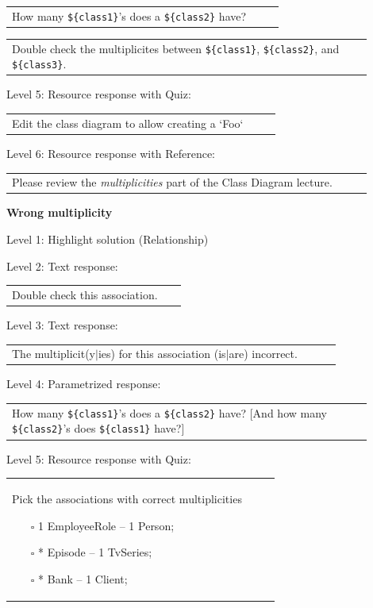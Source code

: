 \begin{tabular}{|p{0.9\linewidth}}
How many \verb|${class1}|'s does a \verb|${class2}| have?
\end{tabular} \medskip

\begin{tabular}{|p{0.9\linewidth}}
Double check the multiplicites between \verb|${class1}|, \verb|${class2}|, and \verb|${class3}|.
\end{tabular} \medskip

\noindent Level 5: Resource response with Quiz: \medskip

\begin{tabular}{|p{0.9\linewidth}}
Edit the class diagram to allow creating a `Foo`
\end{tabular} \medskip

\noindent Level 6: Resource response with Reference: \medskip

\begin{tabular}{|p{0.9\linewidth}}
Please review the \textit{multiplicities} part of the Class Diagram lecture.
\end{tabular} \medskip


\noindent \textbf{Wrong multiplicity} \medskip

\noindent Level 1: Highlight solution (Relationship) \medskip

\noindent Level 2: Text response: \medskip

\begin{tabular}{|p{0.9\linewidth}}
Double check this association.
\end{tabular} \medskip

\noindent Level 3: Text response: \medskip

\begin{tabular}{|p{0.9\linewidth}}
The multiplicit(y$|$ies) for this association (is$|$are) incorrect.
\end{tabular} \medskip

\noindent Level 4: Parametrized response: \medskip

\begin{tabular}{|p{0.9\linewidth}}
How many \verb|${class1}|'s does a \verb|${class2}| have? [And how many \verb|${class2}|'s does \verb|${class1}| have?]
\end{tabular} \medskip

\noindent Level 5: Resource response with Quiz: \medskip

\begin{tabular}{|p{0.9\linewidth}}
Pick the associations with correct multiplicities

\begin{itemize}
    \item[$\square$] 1 EmployeeRole -- 1 Person;
    \item[$\square$] * Episode -- 1 TvSeries;
    \item[$\square$] * Bank -- 1 Client;
\end{itemize}

\end{tabular} \medskip

